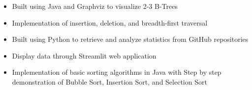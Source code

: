 \begin{itemize}
    \item Built using Java and Graphviz to visualize 2-3 B-Trees
    \item Implementation of insertion, deletion, and breadth-first traversal
\end{itemize}
\begin{itemize}
    \item Built using Python to retrieve and analyze statistics from GitHub repositories
    \item Display data through Streamlit web application
\end{itemize}
\begin{itemize}
    \item Implementation of basic sorting algorithms in Java with Step by step demonstration of Bubble Sort, Insertion Sort, and Selection Sort
\end{itemize}



